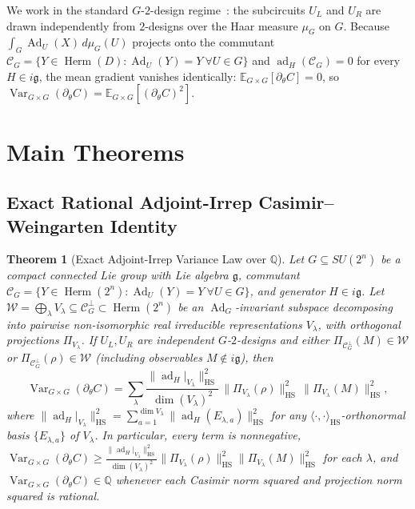 \documentclass[11pt,a4paper]{article}
\newtheorem{theorem}{Theorem}[section]
\theoremstyle{definition}
\theoremstyle{remark}
\newcommand{\QQ}{\mathbb{Q}}
\newcommand{\Var}{\operatorname{Var}}
\newcommand{\Ad}{\operatorname{Ad}}
\newcommand{\ad}{\operatorname{ad}}
\newcommand{\HS}{\mathrm{HS}}
\newcommand{\Herm}{\operatorname{Herm}}
\newcommand{\lieg}{\mathfrak{g}}
\begin{document}
We work in the standard $G$-$2$-design regime~\cite{ragone2024lie,fontana2024characterizing,xie2026structure}: the subcircuits $U_L$ and $U_R$ are drawn independently from $2$-designs over the Haar measure $\mu_G$ on $G$. Because $\int_G \Ad_U(X)\,d\mu_G(U)$ projects onto the commutant $\mathcal{C}_G = \{Y \in \Herm(D) : \Ad_U(Y) = Y\ \forall U \in G\}$ and $\ad_H(\mathcal{C}_G) = 0$ for every $H \in i\lieg$, the mean gradient vanishes identically: $\mathbb{E}_{G\times G}[\partial_\theta C] = 0$, so $\Var_{G\times G}(\partial_\theta C) = \mathbb{E}_{G\times G}[(\partial_\theta C)^2]$.

\section{Main Theorems}

\subsection{Exact Rational Adjoint-Irrep Casimir--Weingarten Identity}

\begin{theorem}[Exact Adjoint-Irrep Variance Law over $\QQ$]\label{thm:adjoint-irrep}
Let $G \subseteq SU(2^n)$ be a compact connected Lie group with Lie algebra $\lieg$, commutant $\mathcal{C}_G = \{Y \in \Herm(2^n) : \Ad_U(Y) = Y\ \forall U \in G\}$, and generator $H \in i\lieg$. Let $\mathcal{W} = \bigoplus_{\lambda} V_\lambda \subseteq \mathcal{C}_G^\perp \subset \Herm(2^n)$ be an $\Ad_G$-invariant subspace decomposing into pairwise non-isomorphic real irreducible representations $V_\lambda$, with orthogonal projections $\Pi_{V_\lambda}$. If $U_L, U_R$ are independent $G$-$2$-designs and either $\Pi_{\mathcal{C}_G^\perp}(M) \in \mathcal{W}$ or $\Pi_{\mathcal{C}_G^\perp}(\rho) \in \mathcal{W}$ (including observables $M \notin i\lieg$), then
\begin{equation}\label{eq:thm31}
  \Var_{G \times G}(\partial_\theta C)
  = \sum_{\lambda} \frac{\|\ad_H|_{V_\lambda}\|_{\HS}^2}{\dim(V_\lambda)^2}\,
    \|\Pi_{V_\lambda}(\rho)\|_{\HS}^2\, \|\Pi_{V_\lambda}(M)\|_{\HS}^2,
\end{equation}
where $\|\ad_H|_{V_\lambda}\|_{\HS}^2 = \sum_{a=1}^{\dim V_\lambda} \|\ad_H(E_{\lambda,a})\|_{\HS}^2$ for any $\langle\cdot,\cdot\rangle_{\HS}$-orthonormal basis $\{E_{\lambda,a}\}$ of $V_\lambda$. In particular, every term is nonnegative, $\Var_{G\times G}(\partial_\theta C) \ge \frac{\|\ad_H|_{V_\lambda}\|_{\HS}^2}{\dim(V_\lambda)^2} \|\Pi_{V_\lambda}(\rho)\|_{\HS}^2 \|\Pi_{V_\lambda}(M)\|_{\HS}^2$ for each $\lambda$, and $\Var_{G\times G}(\partial_\theta C) \in \QQ$ whenever each Casimir norm squared and projection norm squared is rational.
\end{theorem}
\end{document}
